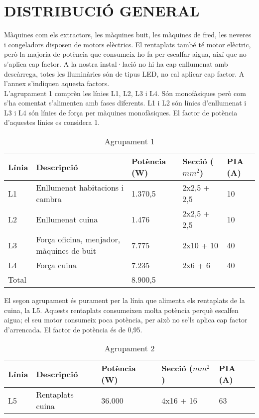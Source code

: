 \chapter{\uppercase{Distribució general}}
Màquines com els extractors, les màquines buit, les màquines de fred, les neveres i congeladors disposen de motors elèctrics. El rentaplats també té motor elèctric, però la majoria de potència que consumeix ho fa per escalfar aigua, així que no s'aplica cap factor.  A la nostra instal·lació no hi ha cap enllumenat amb descàrrega, totes les lluminàries són de tipus LED, no cal aplicar cap factor. A l'annex s'indiquen aquesta factors.\\
\newline
L'agrupament 1 comprèn les línies L1, L2, L3 i L4. Són monofàsiques però com s'ha comentat s'alimenten amb fases diferents. L1 i L2 són línies d'enllumenat i L3 i L4 són línies de força per màquines monofàsiques. El factor de potència d'aquestes línies es considera 1.
%
\begin{table}[H]
\small
\begin{center}
 \begin{tabu} to \textwidth {|X[0.5, l]|X[2, l]|X[r]|X[r]|X[r]|}%
 \hline
 Línia& Descripció & Potència (W) & Secció ($mm^{2}$) & PIA (A)\\
 \hline \hline 
L1 & Enllumenat habitacions i cambra& 1.370,5 &2x2,5 + 2,5& 10 \\ \hline
L2 & Enllumenat cuina & 1.476 \ \ \ \  &2x2,5 + 2,5& 10 \\ \hline 
L3 & Força oficina, menjador, màquines de buit & 7.775 \ \ \ \  &2x10 + 10 & 40 \\ \hline 
L4 & Força cuina & 7.235 \ \ \ \   &2x6 + 6 & 40 \\ \hline 
 \hline
 Total & & 8.900,5 &  &  \\
 \hline
 \end{tabu}
 \caption{Agrupament 1}
\end{center}
\end{table}


\noindent El segon agrupament és purament per la línia que alimenta els rentaplats de la cuina, la L5. Aquests rentaplats consumeixen molta potència perquè escalfen aigua; el seu motor consumeix poca potència, per això no se'ls aplica cap factor d'arrencada. El factor de potència és de 0,95. 
\begin{table}[H]
\small
\begin{center}
 \begin{tabu} to \textwidth {|X[0.5, l]|X[2, l]|X[r]|X[r]|X[r]|}%
 \hline
 Línia& Descripció & Potència (W) & Secció ($mm^{2}$) & PIA (A)\\
 \hline \hline 
L5 & Rentaplats cuina & 36.000 &4x16 + 16& 63 \\
 \hline
 \end{tabu}
 \caption{Agrupament 2}
\end{center}
\end{table}

